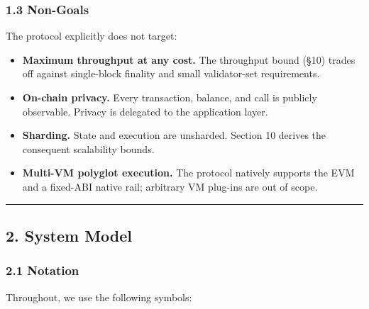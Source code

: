 \documentclass[11pt,a4paper]{article}
\providecommand{\tightlist}{\setlength{\itemsep}{0pt}\setlength{\parskip}{0pt}}
\begin{document}
\hypertarget{13-non-goals}{%
\subsubsection{1.3 Non-Goals}\label{13-non-goals}}

The protocol explicitly does not target:

\begin{itemize}
\tightlist
\item
  \textbf{Maximum throughput at any cost.} The throughput bound (§10)
  trades off against single-block finality and small validator-set
  requirements.
\item
  \textbf{On-chain privacy.} Every transaction, balance, and call is
  publicly observable. Privacy is delegated to the application layer.
\item
  \textbf{Sharding.} State and execution are unsharded. Section 10
  derives the consequent scalability bounds.
\item
  \textbf{Multi-VM polyglot execution.} The protocol natively supports
  the EVM and a fixed-ABI native rail; arbitrary VM plug-ins are out of
  scope.
\end{itemize}

\begin{center}\rule{0.5\linewidth}{0.5pt}\end{center}

\hypertarget{2-system-model}{%
\subsection{2. System Model}\label{2-system-model}}

\hypertarget{21-notation}{%
\subsubsection{2.1 Notation}\label{21-notation}}

Throughout, we use the following symbols:
\end{document}
